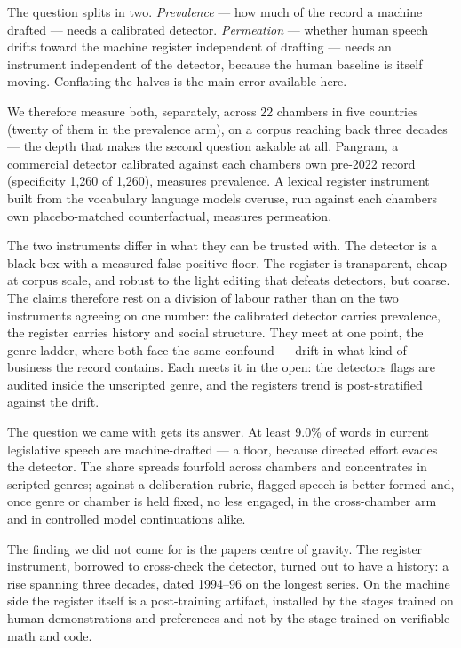 The question splits in two. \emph{Prevalence} --- how much of the record a machine drafted --- needs a calibrated detector. \emph{Permeation} --- whether human speech drifts toward the machine register independent of drafting --- needs an instrument independent of the detector, because the human baseline is itself moving. Conflating the halves is the main error available here.

We therefore measure both, separately, across 22 chambers in five countries (twenty of them in the prevalence arm), on a corpus reaching back three decades --- the depth that makes the second question askable at all. Pangram\cite{pangram2024}, a commercial detector calibrated against each chamber\textquotesingle s own pre-2022 record (specificity 1,260 of 1,260), measures prevalence. A lexical register instrument built from the vocabulary language models overuse, run against each chamber\textquotesingle s own placebo-matched counterfactual, measures permeation.

The two instruments differ in what they can be trusted with. The detector is a black box with a measured false-positive floor. The register is transparent, cheap at corpus scale, and robust to the light editing that defeats detectors, but coarse. The claims therefore rest on a division of labour rather than on the two instruments agreeing on one number: the calibrated detector carries prevalence, the register carries history and social structure. They meet at one point, the genre ladder, where both face the same confound --- drift in what kind of business the record contains. Each meets it in the open: the detector\textquotesingle s flags are audited inside the unscripted genre, and the register\textquotesingle s trend is post-stratified against the drift.

The question we came with gets its answer. At least 9.0\% of words in current legislative speech are machine-drafted --- a floor, because directed effort evades the detector. The share spreads fourfold across chambers and concentrates in scripted genres; against a deliberation rubric, flagged speech is better-formed and, once genre or chamber is held fixed, no less engaged, in the cross-chamber arm and in controlled model continuations alike.

The finding we did not come for is the paper\textquotesingle s centre of gravity. The register instrument, borrowed to cross-check the detector, turned out to have a history: a rise spanning three decades, dated 1994--96 on the longest series. On the machine side the register itself is a post-training artifact, installed by the stages trained on human demonstrations and preferences and not by the stage trained on verifiable math and code.


